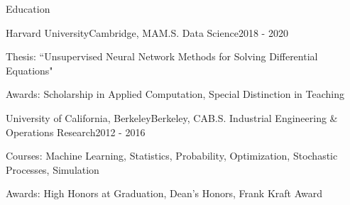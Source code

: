\documentclass{resume} %
\begin{document}

\begin{rSection}{Education}

\begin{rSubsection}{Harvard University}{Cambridge, MA}{M.S. Data Science}{2018 - 2020}
	\item Thesis: ``Unsupervised Neural Network Methods for Solving Differential Equations"
	\item Awards: Scholarship in Applied Computation, Special Distinction in Teaching
\end{rSubsection}
\begin{rSubsection}{University of California, Berkeley}{Berkeley, CA}{B.S. Industrial Engineering \& Operations Research}{2012 - 2016}
	\item Courses: Machine Learning, Statistics, Probability, Optimization, Stochastic Processes, Simulation
	\item Awards: High Honors at Graduation, Dean's Honors, Frank Kraft Award
\end{rSubsection}

\end{rSection}
\end{document}
